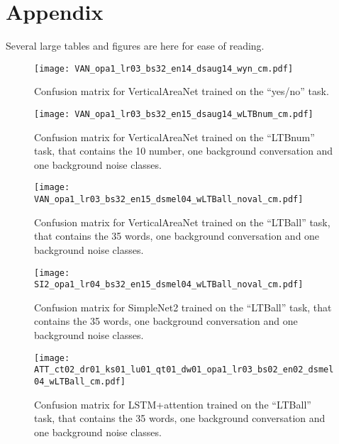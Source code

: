 \section{Appendix}
\label{sec:appendix}

\renewcommand{\thefigure}{A.\arabic{figure}}
\setcounter{figure}{0}

\renewcommand{\thetable}{A.\arabic{table}}
\setcounter{table}{0}

Several large tables and figures are here for ease of reading.

\begin{figure}[t!]
    \centering
    \texttt{[image: VAN\_opa1\_lr03\_bs32\_en14\_dsaug14\_wyn\_cm.pdf]}
    \caption{Confusion matrix for VerticalAreaNet trained on the ``yes/no'' task.}%
    \label{fig:VAN_opa1_lr03_bs32_en14_dsaug14_wyn_cm}
\end{figure}

\begin{figure}[t!]
    \centering
    \texttt{[image: VAN\_opa1\_lr03\_bs32\_en15\_dsaug14\_wLTBnum\_cm.pdf]}
    \caption{Confusion matrix for VerticalAreaNet trained on the ``LTBnum'' task, that contains
        the 10 number, one background conversation and one background noise classes.
    }%
    \label{fig:VAN_opa1_lr03_bs32_en15_dsaug14_wLTBnum_cm}
\end{figure}

\begin{figure*}[t!]
    \centering
    \texttt{[image: VAN\_opa1\_lr03\_bs32\_en15\_dsmel04\_wLTBall\_noval\_cm.pdf]}
    \caption{Confusion matrix for VerticalAreaNet trained on the ``LTBall'' task, that contains
        the 35 words, one background conversation and one background noise classes.
    }%
    \label{fig:VAN_opa1_lr03_bs32_en15_dsmel04_wLTBall_noval_cm}
\end{figure*}

\begin{figure*}[t!]
    \centering
    \texttt{[image: SI2\_opa1\_lr04\_bs32\_en15\_dsmel04\_wLTBall\_noval\_cm.pdf]}
    \caption{Confusion matrix for SimpleNet2 trained on the ``LTBall'' task, that contains
        the 35 words, one background conversation and one background noise classes.
    }%
    \label{fig:SI2_opa1_lr04_bs32_en15_dsmel04_wLTBall_noval_cm}
\end{figure*}

\begin{figure*}[t!]
    \centering
    \texttt{[image: ATT\_ct02\_dr01\_ks01\_lu01\_qt01\_dw01\_opa1\_lr03\_bs02\_en02\_dsmel04\_wLTBall\_cm.pdf]}
    \caption{Confusion matrix for LSTM+attention trained on the ``LTBall'' task, that contains
        the 35 words, one background conversation and one background noise classes.
    }%
    \label{fig:ATT_ct02_dr01_ks01_lu01_qt01_dw01_opa1_lr03_bs02_en02_dsmel04_wLTBall_cm}
\end{figure*}

